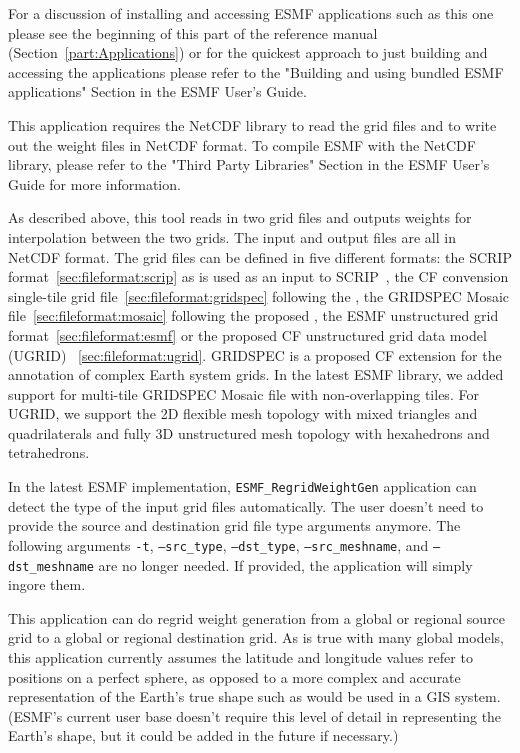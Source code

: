 For a discussion of installing and accessing ESMF applications such as this one please see the beginning of this part of the reference manual (Section~\ref{part:Applications}) or for the quickest approach to just building and accessing the applications please refer to the "Building and using bundled ESMF applications" Section in the ESMF User's Guide.

This application requires the NetCDF library to read the grid files and to write out the weight files in NetCDF format.  To compile ESMF with the NetCDF library, please refer to the "Third Party Libraries" Section in the ESMF User's Guide for more information.

As described above, this tool reads in
two grid files and outputs weights for interpolation
 between the two grids. The input and output files are all in NetCDF format. The grid files can be defined in five
different formats:  the SCRIP format~\ref{sec:fileformat:scrip} as is used as an input to SCRIP~\cite{ref:SCRIP}, the CF convension single-tile grid file~\ref{sec:fileformat:gridspec} following the
, the GRIDSPEC Mosaic file~\ref{sec:fileformat:mosaic} following the proposed ,  
the ESMF unstructured grid format~\ref{sec:fileformat:esmf} or the proposed CF unstructured grid data model (UGRID) ~\ref{sec:fileformat:ugrid}.  GRIDSPEC is a proposed CF extension for the annotation of complex Earth system grids.  In the latest ESMF library, we added support for multi-tile GRIDSPEC Mosaic file with non-overlapping tiles. For UGRID, we support the 2D flexible mesh topology with mixed triangles and quadrilaterals and fully 3D unstructured mesh topology with hexahedrons and tetrahedrons.  

In the latest ESMF implementation,  {\tt ESMF\_RegridWeightGen} application can detect the type of the input grid files automatically.  The user
doesn't need to provide the source and destination grid file type arguments anymore.  The following arguments {\tt -t}, {\tt --src\_type}, {\tt --dst\_type}, {\tt --src\_meshname}, and {\tt --dst\_meshname} are no longer needed.  If provided, the application will simply ingore them.

 This application can do regrid weight generation from a global or regional source grid to a global or regional destination grid.
As is true with many global models, this application currently assumes the latitude and longitude values refer to positions on a perfect sphere, as opposed to a more complex and accurate representation of the Earth's true shape such as would be used in a GIS system. (ESMF's current user base doesn't require this level of detail in representing the Earth's shape, but it could be added in the future if necessary.)

